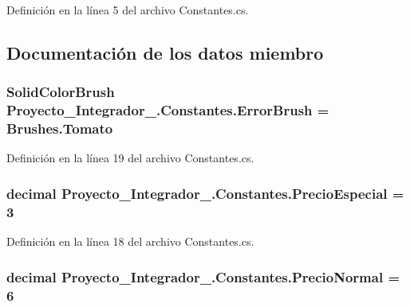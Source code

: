 Definición en la línea 5 del archivo Constantes.\-cs.



\subsection{Documentación de los datos miembro}
\hypertarget{class_proyecto___integrador__3_1_1_constantes_a419bedac3e351c570a011551198e9a95}{
\subsubsection[{Error\-Brush}]{\setlength{\rightskip}{0pt plus 5cm}Solid\-Color\-Brush Proyecto\-\_\-\-Integrador\-\_.\-Constantes.\-Error\-Brush = Brushes.\-Tomato\hspace{0.3cm}{\ttfamily [static]}}}\label{class_proyecto___integrador__3_1_1_constantes_a419bedac3e351c570a011551198e9a95}


Definición en la línea 19 del archivo Constantes.\-cs.

\hypertarget{class_proyecto___integrador__3_1_1_constantes_a5abb6cd9a7424875b66986ece8453f81}{
\subsubsection[{Precio\-Especial}]{\setlength{\rightskip}{0pt plus 5cm}decimal Proyecto\-\_\-\-Integrador\-\_.\-Constantes.\-Precio\-Especial = 3\hspace{0.3cm}{\ttfamily [static]}}}\label{class_proyecto___integrador__3_1_1_constantes_a5abb6cd9a7424875b66986ece8453f81}


Definición en la línea 18 del archivo Constantes.\-cs.

\hypertarget{class_proyecto___integrador__3_1_1_constantes_ab04a6b8a156bab28af32fa1ef65c4051}{
\subsubsection[{Precio\-Normal}]{\setlength{\rightskip}{0pt plus 5cm}decimal Proyecto\-\_\-\-Integrador\-\_.\-Constantes.\-Precio\-Normal = 6\hspace{0.3cm}{\ttfamily [static]}}}\label{class_proyecto___integrador__3_1_1_constantes_ab04a6b8a156bab28af32fa1ef65c4051}


